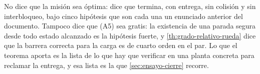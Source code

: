 \begin{observacion}
\label{obs:entrega-alcance}
No dice que la misión sea óptima: dice que termina, con entrega, sin
colisión y sin interbloqueo, bajo cinco hipótesis que son cada una un
enunciado anterior del documento. Tampoco dice que (A5) sea gratis: la
existencia de una parada segura desde todo estado alcanzado es la hipótesis
fuerte, y \cref{th:grado-relativo-rueda} dice que la barrera correcta para la
carga es de cuarto orden en el par. Lo que el teorema aporta es la lista de
lo que hay que verificar en una planta concreta para reclamar la entrega, y
esa lista es la que \cref{sec:ensayo-cierre} recorre.
\end{observacion}

